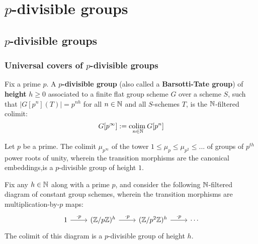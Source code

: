 \section{\texorpdfstring{$p$}{}-divisible groups}
    \subsection{\texorpdfstring{$p$}{}-divisible groups}
        \subsubsection{Universal covers of \texorpdfstring{$p$}{}-divisible groups}
            \begin{definition} \label{def: p_divisible_groups}
                Fix a prime $p$. A \textbf{$p$-divisible group} (also called a \textbf{Barsotti-Tate group}) of \textbf{height} $h \geq 0$ associated to a finite flat group scheme $G$ over a scheme $S$, such that $|G[p^n](T)| = p^{nh}$ for all $n \in \mathbb{N}$ and all $S$-schemes $T$, is the $\mathbb{N}$-filtered colimit:
                    $$G[p^{\infty}] := \underset{n \in \mathbb{N}}{\operatorname{colim} \:} G[p^n]$$
            \end{definition}
            \begin{example}
                Let $p$ be a prime. The colimit $\mu_{p^{\infty}}$ of the tower $1 \leq \mu_p \leq \mu_{p^2} \leq ...$ of groups of $p^{th}$ power roots of unity, wherein the transition morphisms are the canonical embeddings,is a $p$-divisible group of height $1$. 
            \end{example}
            \begin{example}
                Fix any $h \in \mathbb{N}$ along with a prime $p$, and consider the following $\mathbb{N}$-filtered diagram of constant group schemes, wherein the transition morphisms are multiplication-by-$p$ maps:
                    $$
                        \begin{tikzcd}
                        	1 & {(\Z/p\Z)^h} & {(\Z/p^2\Z)^h} & \cdots
                        	\arrow["{\cdot p}", from=1-2, to=1-3]
                        	\arrow["{\cdot p}", from=1-3, to=1-4]
                        	\arrow["{\cdot p}", from=1-1, to=1-2]
                        \end{tikzcd}
                    $$
                The colimit of this diagram is a $p$-divisible group of height $h$.
            \end{example}
